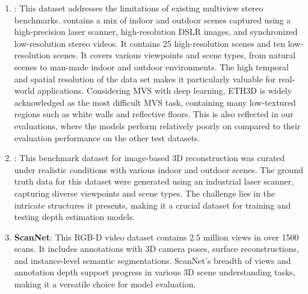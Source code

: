 \begin{enumerate}
    \item \textbf{\ethd}\cite{Schoeps2017}: This dataset addresses the limitations of existing multiview stereo benchmarks. {\ethd} contains a mix of indoor and outdoor scenes captured using a high-precision laser scanner, high-resolution DSLR images, and synchronized low-resolution stereo videos. It contains 25 high-resolution scenes and ten low-resolution scenes. It covers various viewpoints and scene types, from natural scenes to man-made indoor and outdoor environments. The high temporal and spatial resolution of the data set makes it particularly valuable for real-world applications. Considering MVS with deep learning, ETH3D is widely acknowledged as the most difficult MVS task, containing many low-textured regions such as white walls and reflective floors. This is also reflected in our evaluations, where the models perform relatively poorly on {\ethd} compared to their evaluation performance on the other test datasets. 
    \item \textbf{\tanksandtemples}\cite{Knapitsch2017}: This benchmark dataset for image-based 3D reconstruction was curated under realistic conditions with various indoor and outdoor scenes. The ground truth data for this dataset were generated using an industrial laser scanner, capturing diverse viewpoints and scene types. The challenge lies in the intricate structures it presents, making it a crucial dataset for training and testing depth estimation models.
    \item \textbf{ScanNet}\cite{Dai2017}: This RGB-D video dataset contains 2.5 million views in over 1500 scans. It includes annotations with 3D camera poses, surface reconstructions, and instance-level semantic segmentations. ScanNet's breadth of views and annotation depth support progress in various 3D scene understanding tasks, making it a versatile choice for model evaluation.
\end{enumerate}
